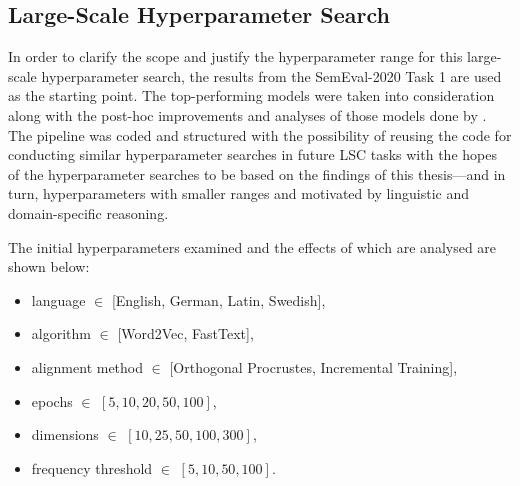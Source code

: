 \subsection{Large-Scale Hyperparameter Search}


In order to clarify the scope and justify the hyperparameter range for this large-scale hyperparameter search, the results from the SemEval-2020 Task 1 are used as the starting point. The top-performing models were taken into consideration along with the post-hoc improvements and analyses of those models done by \citet{kaiser-etal-2020-ims}. The pipeline was coded and structured with the possibility of reusing the code for conducting similar hyperparameter searches in future LSC tasks with the hopes of the hyperparameter searches to be based on the findings of this thesis—and in turn, hyperparameters with smaller ranges and motivated by linguistic and domain-specific reasoning. 





The initial hyperparameters examined and the effects of which are analysed are shown below:
\begin{itemize}
    \item language $\in$ [English, German, Latin, Swedish],
    \item algorithm $\in$ [Word2Vec, FastText],
    \item alignment method $\in$ [Orthogonal Procrustes, Incremental Training],
    \item epochs $\in$ $[5, 10, 20, 50, 100]$,
    \item dimensions $\in$ $[10, 25, 50, 100, 300]$,
    \item frequency threshold $\in$ $[5, 10, 50, 100]$.
\end{itemize}%


